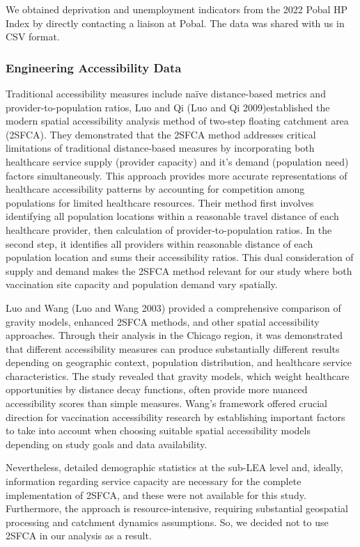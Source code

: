\documentclass{article}
\begin{document}
We obtained deprivation and unemployment indicators from the 2022 Pobal
HP Index by directly contacting a liaison at Pobal. The data was shared
with us in CSV format.

\subsubsection{Engineering Accessibility
Data}\label{engineering-accessibility-data}

Traditional accessibility measures include naïve distance-based metrics
and provider-to-population ratios, Luo and Qi (Luo and Qi
2009)established the modern spatial accessibility analysis method of
two-step floating catchment area (2SFCA). They demonstrated that the
2SFCA method addresses critical limitations of traditional
distance-based measures by incorporating both healthcare service supply
(provider capacity) and it's demand (population need) factors
simultaneously. This approach provides more accurate representations of
healthcare accessibility patterns by accounting for competition among
populations for limited healthcare resources. Their method first
involves identifying all population locations within a reasonable travel
distance of each healthcare provider, then calculation of
provider-to-population ratios. In the second step, it identifies all
providers within reasonable distance of each population location and
sums their accessibility ratios. This dual consideration of supply and
demand makes the 2SFCA method relevant for our study where both
vaccination site capacity and population demand vary spatially.

Luo and Wang (Luo and Wang 2003) provided a comprehensive comparison of
gravity models, enhanced 2SFCA methods, and other spatial accessibility
approaches. Through their analysis in the Chicago region, it was
demonstrated that different accessibility measures can produce
substantially different results depending on geographic context,
population distribution, and healthcare service characteristics. The
study revealed that gravity models, which weight healthcare
opportunities by distance decay functions, often provide more nuanced
accessibility scores than simple measures. Wang's framework offered
crucial direction for vaccination accessibility research by establishing
important factors to take into account when choosing suitable spatial
accessibility models depending on study goals and data availability.

Nevertheless, detailed demographic statistics at the sub-LEA level and,
ideally, information regarding service capacity are necessary for the
complete implementation of 2SFCA, and these were not available for this
study. Furthermore, the approach is resource-intensive, requiring
substantial geospatial processing and catchment dynamics assumptions.
So, we decided not to use 2SFCA in our analysis as a result.
\end{document}
